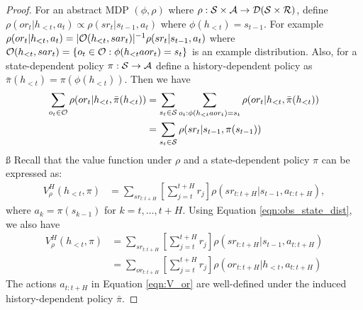     \begin{proof}
        For an abstract MDP $(\phi, \rho)$ where $\rho: \mathcal{S} \times \mathcal{A} \to \mathcal{D}(\mathcal{S} \times \mathcal{R})$, define $\rho(or_t | h_{<t}, a_t) \propto \rho(sr_t | s_{t-1}, a_t)$ where $\phi(h_{<t}) = s_{t-1}$. For example $\rho(or_t | h_{<t}, a_t) = \lvert \mathcal{O}(h_{<t}, sar_t) \rvert^{-1}\rho(sr_t | s_{t-1}, a_t)$ where $\mathcal{O}(h_{<t}, sar_t) = \{o_t \in \mathcal{O}: \phi(h_{<t}aor_t) = s_t\}$ is an example distribution. Also, for a state-dependent policy $\pi: \mathcal{S} \to \mathcal{A}$ define a history-dependent policy as $\bar{\pi}(h_{<t}) = \pi(\phi(h_{<t}))$. Then we have
        \begin{align}
            \sum_{o_t \in \mathcal{O}} \rho(or_t | h_{<t}, \bar{\pi}(h_{<t})) &= \sum_{s_t \in \mathcal{S}} \sum_{o_t: \phi(h_{<t}aor_t) = s_t} \rho(or_{t} | h_{<t}, \bar{\pi}(h_{<t})) \nonumber\\
            &= \sum_{s_t \in \mathcal{S}} \rho(sr_t | s_{t-1}, \pi(s_{t-1})) \label{eqn:obs_state_dist}
        \end{align}
    ß
        Recall that the value function under $\rho$ and a state-dependent policy $\pi$ can be expressed as:
        \begin{align*}
            V_{\rho}^{H}(h_{<t}, \pi) &= \sum_{sr_{t:t+H}} \left[ \sum_{j=t}^{t+H} r_j \right] \rho(sr_{t:t+H} | s_{t-1}, a_{t:t+H}),
        \end{align*}
        where $a_k = \pi(s_{k-1})$ for $k = t, \ldots, t+H$. 
        Using Equation \ref{eqn:obs_state_dist}, we also have
        \begin{align}
            V_{\rho}^{H}(h_{<t}, \pi) &= \sum_{sr_{t:t+H}} \left[ \sum_{j=t}^{t+H} r_j \right] \rho(sr_{t:t+H} | s_{t-1}, a_{t:t+H}) \nonumber \\
            &= \sum_{or_{t:t+H}} \left[ \sum_{j=t}^{t+H} r_j \right] \rho(or_{t:t+H} | h_{<t}, a_{t:t+H}) \label{eqn:V_or}
        \end{align}
        The actions $a_{t:t+H}$ in Equation \ref{eqn:V_or} are well-defined under the induced history-dependent policy $\bar{\pi}$.
    

\end{proof}
